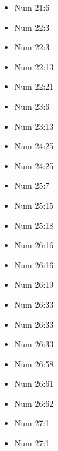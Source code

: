 \documentclass[14pt]{article}
\begin{document}
\begin{multicols}{2}
\begin{itemize}
\item Num 21:6

\item Num 22:3

\item Num 22:3

\item Num 22:13

\item Num 22:21

\item Num 23:6

\item Num 23:13

\item Num 24:25

\item Num 24:25

\item Num 25:7

\item Num 25:15

\item Num 25:18

\item Num 26:16

\item Num 26:16

\item Num 26:19

\item Num 26:33

\item Num 26:33

\item Num 26:33

\item Num 26:58

\item Num 26:61

\item Num 26:62

\item Num 27:1

\item Num 27:1


\end{itemize}
\end{multicols}
\end{document}
